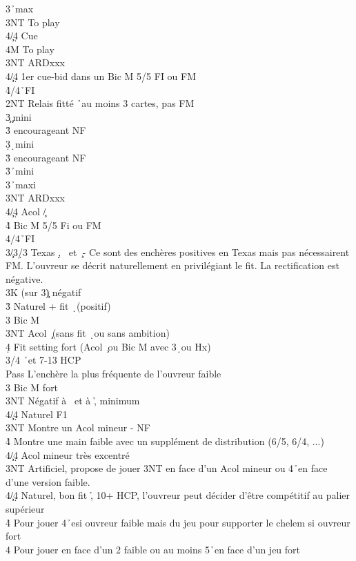 \documentclass[a4paper]{article}
\begin{document}
\begin{bidtable}
3\s {}\h\ max\+\\
3NT \> To play\\
4\c/4\d \> Cue \h \\
4M \> To play\-\\
3NT \> ARDxxx \h \\
4\c/4\d \> 1er cue-bid dans un Bic M 5/5 FI ou FM\\
4\h {}\s /4\h\ FI\-\\
2NT \> Relais fitté \h\ au moins 3 cartes, pas FM\+\\
3\c {}\c\ mini\+\\
3\h \> encourageant NF\-\\
3\d {}\d\ mini\+\\
3\h \> encourageant NF\-\\
3\h {}\h\ mini\\
3\s {}\h\ maxi\\
3NT \> ARDxxx \h \\
4\c/4\d \> Acol \c /\d \\
4\h \> Bic M 5/5 Fi ou FM\\
4\s {}\s /4\h\ FI\-\\
3\c/3\d/3\s \> Texas \d , \s\ et \c\ - Ce sont des enchères positives en Texas mais pas nécessairent FM. L'ouvreur se décrit naturellement en privilégiant le fit. La rectification est négative.\+\\
3K \> (sur 3\c ) négatif\\
3\h \> Naturel + fit \d\ (positif)\\
3\s \> Bic M\\
3NT \> Acol \c\ (sans fit \d\ ou sans ambition)\\
4\d \> Fit setting fort (Acol \c\ ou Bic M avec 3\d\ ou Hx)\-\\
3\s {}/4 \h\ et 7-13 HCP\+\\
Pass \> L'enchère la plus fréquente de l'ouvreur faible\\
3\s \> Bic M fort\+\\
3NT \> Négatif à \s\ et à \h , minimum\\
4\c/4\d \> Naturel F1\-\\
3NT \> Montre un Acol mineur - NF\\
4\h \> Montre une main faible avec un supplément de distribution (6/5, 6/4, ...)\\
4\c/4\d \> Acol mineur très excentré\-\\
3NT \> Artificiel, propose de jouer 3NT en face d'un Acol mineur ou 4\h\ en face d'une version faible.\\
4\c/4\d \> Naturel, bon fit \h , 10+ HCP, l'ouvreur peut décider d'être compétitif au palier supérieur\\
4\h \> Pour jouer 4\h\ esi ouvreur faible mais du jeu pour supporter le chelem si ouvreur fort\\
4\s \> Pour jouer en face d'un 2 faible ou au moins 5\h\ en face d'un jeu fort\-
\end{bidtable}
\end{document}
